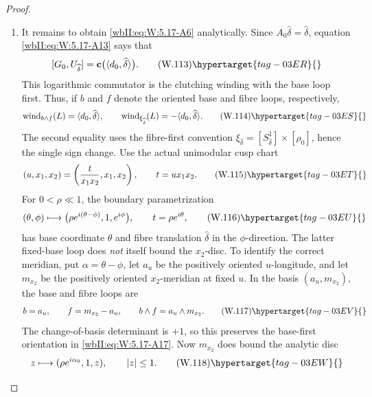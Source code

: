 \begin{proof}
\begin{enumerate}[label={$\langle1\rangle$\arabic*.},leftmargin=*]
\item It remains to obtain \eqref{wbII:eq:W:5.17-A6} analytically.  Since
\(A_0\widehat\delta=\widehat\delta\), equation \eqref{wbII:eq:W:5.17-A13} says that
\[
 [G_0,U_{\widehat\delta}]
 =\mathbf c\bigl(\langle d_0,\widehat\delta\rangle\bigr).
\tag{W.113}\hypertarget{tag-03ER}{}\label{wbII:eq:W:5.17-A16}
\]
This logarithmic commutator is the clutching winding with the base loop
first.  Thus, if \(b\) and \(f\) denote the oriented base and fibre loops,
respectively,
\[
 \operatorname{wind}_{b\wedge f}(L)
  =\langle d_0,\widehat\delta\rangle,
 \qquad
 \operatorname{wind}_{\xi_{\widehat\delta}}(L)
 =-\langle d_0,\widehat\delta\rangle.
\tag{W.114}\hypertarget{tag-03ES}{}\label{wbII:eq:W:5.17-A17}
\]
The second equality uses the fibre-first convention
\(\xi_{\widehat\delta}=[S^1_{\widehat\delta}]\times[\rho_0]\), hence the
single sign change.
Use the actual unimodular cusp chart
\[
 (u,x_1,x_2)=\left(\frac{t}{x_1x_2},x_1,x_2\right),
 \qquad t=ux_1x_2.
\tag{W.115}\hypertarget{tag-03ET}{}\label{wbII:eq:W:5.17-A18}
\]
For \(0<\rho\ll1\), the boundary parametrization
\[
 (\theta,\phi)\longmapsto
 \bigl(\rho e^{i(\theta-\phi)},1,e^{i\phi}\bigr),
 \qquad t=\rho e^{i\theta},
\tag{W.116}\hypertarget{tag-03EU}{}\label{wbII:eq:W:5.17-A19}
\]
has base coordinate \(\theta\) and fibre translation
\(\widehat\delta\) in the \(\phi\)-direction.  The latter fixed-base loop
does \emph{not} itself bound the \(x_2\)-disc.  To identify the correct
meridian, put \(\alpha=\theta-\phi\), let \(a_u\) be the positively
oriented \(u\)-longitude, and let \(m_{x_2}\) be the positively oriented
\(x_2\)-meridian at fixed \(u\).  In the basis
\((a_u,m_{x_2})\), the base and fibre loops are
\[
 b=a_u,
 \qquad
 f=m_{x_2}-a_u,
 \qquad
 b\wedge f=a_u\wedge m_{x_2}.
\tag{W.117}\hypertarget{tag-03EV}{}\label{wbII:eq:W:5.17-A19a}
\]
The change-of-basis determinant is \(+1\), so this preserves the
base-first orientation in \eqref{wbII:eq:W:5.17-A17}.  Now \(m_{x_2}\) does bound the
analytic disc
\[
 z\longmapsto(\rho e^{i\alpha_0},1,z),
 \qquad |z|\le1.
\tag{W.118}\hypertarget{tag-03EW}{}\label{wbII:eq:W:5.17-A19b}
\]


\end{enumerate}
\end{proof}
